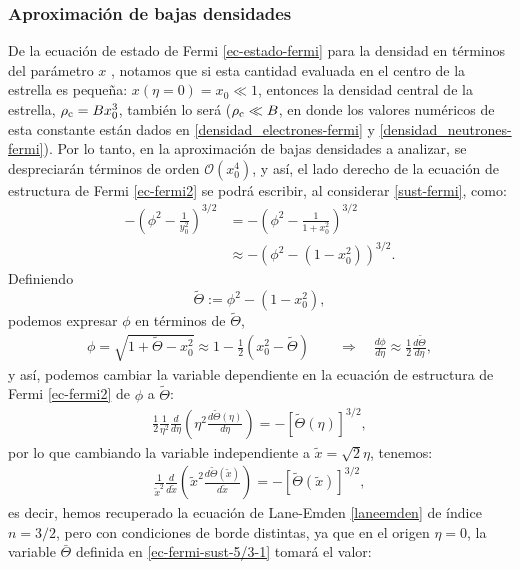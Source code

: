 \subsubsection{Aproximación de bajas densidades}
De la ecuación de estado de Fermi \eqref{ec-estado-fermi} para la densidad en términos del parámetro $x$ , notamos que si esta cantidad evaluada en el centro de la estrella es pequeña: $x(\eta=0)=x_0\ll1$, entonces la densidad central de la estrella, $\rho_{\rm c}=Bx_0^3$, también lo será ($\rho_{\rm c}\ll B$, en donde los valores numéricos de esta constante están dados en \eqref{densidad_electrones-fermi} y \eqref{densidad_neutrones-fermi}). Por lo tanto, en la aproximación de bajas densidades a analizar, se despreciarán términos de orden $\mathcal{O}(x_0^4)$, y así, el lado derecho de la ecuación de estructura de Fermi \eqref{ec-fermi2} se podrá escribir, al considerar \eqref{sust-fermi}, como:
\begin{align}
 -\left(\phi^2-\frac{1}{y_0^2}\right)^{3/2}&=-\left(\phi^2-\frac{1}{1+x_0^2}\right)^{3/2}\\
&\approx-\left(\phi^2-(1-x_0^2)\right)^{3/2}.
\end{align}
Definiendo
\begin{equation}\label{ec-fermi-sust-5/3-1}
 \widetilde{\Theta}:=\phi^2-(1-x_0^2),
\end{equation}
podemos expresar $\phi$ en términos de $\widetilde{\Theta}$,
\begin{align}
\phi=\sqrt{1+\widetilde{\Theta}-x_0^2}\approx1-\frac{1}{2}\left(x_0^2-\widetilde{\Theta}\right)\qquad\Rightarrow\quad \frac{d\phi}{d\eta}\approx\frac{1}{2}\frac{d\widetilde{\Theta}}{d\eta},\label{ec-fermi-sust-5/3}
\end{align}
y así, podemos cambiar la variable dependiente en la ecuación de estructura de Fermi \eqref{ec-fermi2} de $\phi$ a $\widetilde{\Theta}$:
\begin{align}\label{ec-fermi-ec5/3-1}
 \frac{1}{2}\frac{1}{\eta^2}\frac{d}{d\eta}\left(\eta^2\frac{d\widetilde{\Theta}(\eta)}{d\eta}\right)=-\left[\widetilde{\Theta}(\eta)\right]^{3/2},
\end{align}
por lo que cambiando la variable independiente a $\widetilde{x}=\sqrt{2}\eta$, tenemos:
\begin{align}\label{ec-fermi-ec5/3-2}
 \frac{1}{\widetilde{x}^2}\frac{d}{d\widetilde{x}}\left(\widetilde{x}^2\frac{d\widetilde{\Theta}(\widetilde{x})}{d\widetilde{x}}\right)=-\left[\widetilde{\Theta}(\widetilde{x})\right]^{3/2},
\end{align}
es decir, hemos recuperado la ecuación de Lane-Emden  \eqref{laneemden} de índice $n=3/2$, pero con condiciones de borde distintas, ya que en el origen $\eta=0$, la variable $\bar{\Theta}$  definida en \eqref{ec-fermi-sust-5/3-1} tomará el valor:

